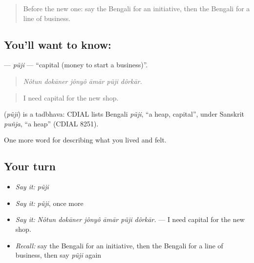 \begin{quote}
Before the new one: say the Bengali for an initiative, then the Bengali for a line of business.
\end{quote}

\subsection*{You'll want to know: }
\textbf{} — \emph{pũji} — \textquotedblleft{}capital (money to start a business)\textquotedblright{}.

\begin{quote}
     
\end{quote}

\begin{quote}
\emph{Nôtun dokāner jônyô āmār pũji dôrkār.}
\end{quote}

\begin{quote}
I need capital for the new shop.
\end{quote}

\begin{cousinweb}
\textbf{} (\emph{pũji}) is a tadbhava: CDIAL lists Bengali \emph{pũji}, \textquotedblleft{}a heap, capital\textquotedblright{}, under Sanskrit \emph{puñja}, \textquotedblleft{}a heap\textquotedblright{} (CDIAL 8251).
\end{cousinweb}

\begin{grammarlens}[title={What you've built}]
One more word for describing what you lived and felt.
\end{grammarlens}

\subsection*{Your turn}
\begin{itemize}
\raggedright
  \item \emph{Say it:} \emph{pũji}
  \item \emph{Say it:} \emph{pũji}, once more
  \item \emph{Say it:} \emph{Nôtun dokāner jônyô āmār pũji dôrkār.} — I need capital for the new shop.
  \item \emph{Recall:} say the Bengali for an initiative, then the Bengali for a line of business, then say \emph{pũji} again
\end{itemize}

